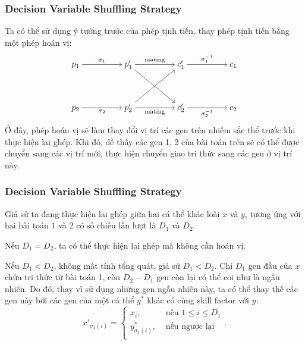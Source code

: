 \begin{frame}[fragile]
\frametitle{Decision Variable Shuffling Strategy}
Ta có thể sử dụng ý tưởng trước của phép tịnh tiến, thay phép tịnh tiến bằng
một phép hoán vị:
\[\begin{tikzcd}[cramped]
	{p_1} && {p_1'} && {c_1'} && {c_1} \\
	\\
	{p_2} && {p_2'} && {c'_2} && {c_2}
	\arrow["{\sigma_1}", from=1-1, to=1-3]
	\arrow["{\sigma_2}"', from=3-1, to=3-3]
	\arrow[from=3-3, to=1-5]
	\arrow[from=1-3, to=3-5]
	\arrow["{\text{mating}}", from=1-3, to=1-5]
	\arrow["{\text{mating}}"', from=3-3, to=3-5]
	\arrow["{\sigma_1^{-1}}", from=1-5, to=1-7]
	\arrow["{\sigma_2^{-1}}"', from=3-5, to=3-7]
\end{tikzcd}\]
Ở đây, phép hoán vị sẽ làm thay đổi vị trí các gen trên nhiễm sắc thể trước khi
thực hiện lai ghép. Khi đó, dễ thấy các gen 1, 2 của bài toán trên sẽ có thể
được chuyển sang các vị trí mới, thực hiện chuyển giao tri thức sang các gen ở vị
trí này.
\end{frame}

\begin{frame}[fragile]
\frametitle{Decision Variable Shuffling Strategy}
Giả sử ta đang thực hiện lai ghép giữa hai cá thể khác loài \( x \) và \( y \),
tương ứng với hai bài toán 1 và 2 có số chiều lần lượt là \( D_{1} \) và \(
D_{2} \).

Nếu \( D_{1} = D_{2} \), ta có thể thực hiện lai ghép mà không cần hoán vị.

Nếu \( D_{1} < D_{2} \), không mất tính tổng quát, giả sử \( D_{1} < D_{2} \).
Chỉ \( D_{1} \) gen đầu của \( x \) chứa tri thức từ bài toán 1, còn \( D_{2} -
D_{1}\) gen còn lại có thể coi như là ngẫu nhiên. Do đó, thay vì sử dụng những
gen ngẫu nhiên này, ta có thể thay thế các gen này bởi các gen của một cá thể \(
y^{*} \) khác có cùng skill factor với \( y \):
\[
  x'_{\sigma_{1}(i)} = \begin{cases}
    x_{i}, &\text{ nếu } 1 \le i \le D_{1}\\
    y^{*}_{\sigma_{1}(i)}, &\text{ nếu ngược lại }\\
  \end{cases}
.\] 
\end{frame}


